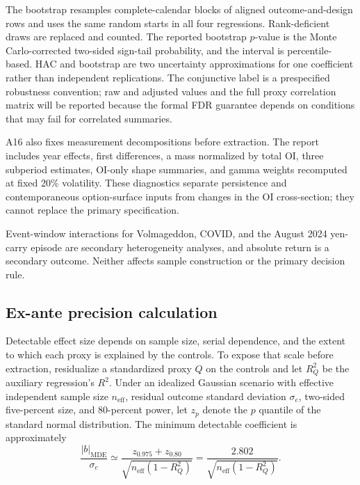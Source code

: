 \documentclass[11pt]{article}
\begin{document}
The bootstrap resamples complete-calendar blocks of aligned outcome-and-design rows and uses
the same random starts in all four regressions.  Rank-deficient draws are replaced and
counted.  The reported bootstrap $p$-value is the Monte Carlo-corrected two-sided sign-tail
probability, and the interval is percentile-based.  HAC and bootstrap are two uncertainty
approximations for one coefficient rather than independent replications.  The conjunctive
label is a prespecified robustness convention; raw and adjusted values and the full proxy
correlation matrix will be reported because the formal FDR guarantee depends on conditions
that may fail for correlated summaries.

A16 also fixes measurement decompositions before extraction.  The report includes year
effects, first differences, a mass normalized by total OI, three subperiod estimates,
OI-only shape summaries, and gamma weights recomputed at fixed 20\% volatility.  These
diagnostics separate persistence and contemporaneous option-surface inputs from changes in
the OI cross-section; they cannot replace the primary specification.

Event-window interactions for Volmageddon, COVID, and the August 2024 yen-carry episode are
secondary heterogeneity analyses, and absolute return is a secondary outcome.  Neither
affects sample construction or the primary decision rule.

\subsection{Ex-ante precision calculation}

Detectable effect size depends on sample size, serial dependence, and the extent to which
each proxy is explained by the controls.  To expose that scale before extraction, residualize
a standardized proxy $Q$ on the controls and let $R_Q^2$ be the auxiliary regression's
$R^2$.  Under an idealized Gaussian scenario with effective independent sample size
$n_{\mathrm{eff}}$, residual outcome standard deviation $\sigma_e$, two-sided five-percent
size, and 80-percent power, let $z_p$ denote the $p$ quantile of the standard normal
distribution.  The minimum detectable coefficient is approximately
\begin{equation}
\frac{|b|_{\mathrm{MDE}}}{\sigma_e}
\simeq \frac{z_{0.975}+z_{0.80}}
{\sqrt{n_{\mathrm{eff}}(1-R_Q^2)}}
=\frac{2.802}{\sqrt{n_{\mathrm{eff}}(1-R_Q^2)}}. \label{eq:mde}
\end{equation}
\end{document}
